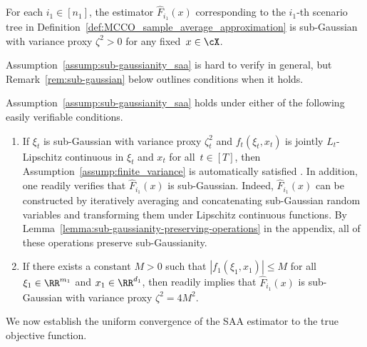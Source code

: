 \documentclass[11pt]{article}
\let\hat\widehat
\begin{document}
\begin{assumption}[Sub-Gaussianity of $\hat F_{i_1}(x)$]
\label{assump:sub-gaussianity_saa} 
For each $i_1\in[n_1]$, the estimator $\hat F_{i_1}(x)$ corresponding to the $i_1$-th scenario tree in Definition~\ref{def:MCCO_sample_average_approximation} is sub-Gaussian with variance proxy $\zeta^2>0$ for any fixed~$x\in\cX$.
\end{assumption}

Assumption~\ref{assump:sub-gaussianity_saa} is hard to verify in general, but Remark~\ref{rem:sub-gaussian} below outlines conditions when it holds.

\begin{rem}
\label{rem:sub-gaussian}
Assumption~\ref{assump:sub-gaussianity_saa} holds under either of the following easily verifiable conditions.
\begin{enumerate}[label=(\roman*)]
    \item If $\xi_t$ is sub-Gaussian with variance proxy $\zeta_t^2$ and $f_t(\xi_t,x_t)$ is jointly $L_t$-Lipschitz continuous in $\xi_t$ and $x_t$ for all~$t\in[T]$, then Assumption~\ref{assump:finite_variance} is automatically satisfied \cite[Exercise~2.5]{wainwright2019high}. In addition, one readily verifies that $\hat F_{i_1}(x)$ is sub-Gaussian. Indeed, $\hat F_{i_1}(x)$ can be constructed by iteratively averaging and concatenating sub-Gaussian random variables and transforming them under Lipschitz continuous functions. By Lemma~\ref{lemma:sub-gaussianity-preserving-operations} in the appendix, all of these operations preserve sub-Gaussianity.

    \item If there exists a constant $M>0$ such that $|f_1(\xi_1,x_1)|\leq M$ for all $\xi_1\in\RR^{m_1}$ and $x_1\in\RR^{d_1}$, then \cite[Example~2.4]{wainwright2019high} readily implies that $\hat F_{i_1}(x)$ is sub-Gaussian with variance proxy $\zeta^2=4M^2$.
\end{enumerate}
\end{rem}

We now establish the uniform convergence of the SAA estimator to the true objective function.
\end{document}

